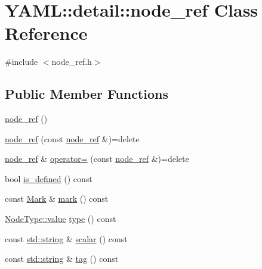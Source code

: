 \hypertarget{class_y_a_m_l_1_1detail_1_1node__ref}{}\section{Y\+A\+ML\+::detail\+::node\+\_\+ref Class Reference}
\label{class_y_a_m_l_1_1detail_1_1node__ref}


{\ttfamily \#include $<$node\+\_\+ref.\+h$>$}

\subsection*{Public Member Functions}
\begin{DoxyCompactItemize}
\item 
\mbox{\hyperlink{class_y_a_m_l_1_1detail_1_1node__ref_ae5041efdcc47629574078dfdf2d9ca0e}{node\+\_\+ref}} ()
\item 
\mbox{\hyperlink{class_y_a_m_l_1_1detail_1_1node__ref_a3bec7e366695b27c9f21bc1bd7722087}{node\+\_\+ref}} (const \mbox{\hyperlink{class_y_a_m_l_1_1detail_1_1node__ref}{node\+\_\+ref}} \&)=delete
\item 
\mbox{\hyperlink{class_y_a_m_l_1_1detail_1_1node__ref}{node\+\_\+ref}} \& \mbox{\hyperlink{class_y_a_m_l_1_1detail_1_1node__ref_ada3f5b5bc9ee4b26a0fbafdeac0a9da9}{operator=}} (const \mbox{\hyperlink{class_y_a_m_l_1_1detail_1_1node__ref}{node\+\_\+ref}} \&)=delete
\item 
bool \mbox{\hyperlink{class_y_a_m_l_1_1detail_1_1node__ref_aaf84b14333ff431a4d6d0f5acaa4ed0d}{is\+\_\+defined}} () const
\item 
const \mbox{\hyperlink{struct_y_a_m_l_1_1_mark}{Mark}} \& \mbox{\hyperlink{class_y_a_m_l_1_1detail_1_1node__ref_abe162fcbe772cb38bd360aa7c066f241}{mark}} () const
\item 
\mbox{\hyperlink{struct_y_a_m_l_1_1_node_type_af83cf3f3c2eca0bf0eae1bbf981e86c4}{Node\+Type\+::value}} \mbox{\hyperlink{class_y_a_m_l_1_1detail_1_1node__ref_abee2b9c7917291f4563134d37ae9351c}{type}} () const
\item 
const \mbox{\hyperlink{glad_8h_ac83513893df92266f79a515488701770}{std\+::string}} \& \mbox{\hyperlink{class_y_a_m_l_1_1detail_1_1node__ref_a45438a60ee1b8a64699d130cf96ffbb6}{scalar}} () const
\item 
const \mbox{\hyperlink{glad_8h_ac83513893df92266f79a515488701770}{std\+::string}} \& \mbox{\hyperlink{class_y_a_m_l_1_1detail_1_1node__ref_a1b430d732fe80b2fdfaa5103e329e428}{tag}} () const
\item 

\end{DoxyCompactItemize}
